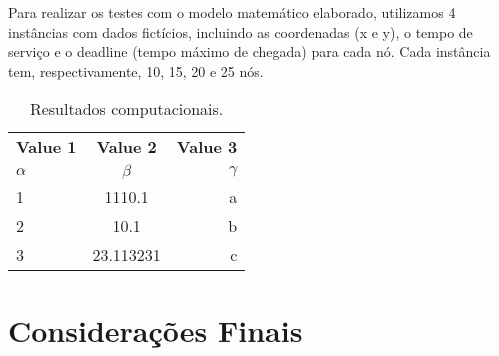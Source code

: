 \documentclass[12pt]{article}
\begin{document}
Para realizar os testes com o modelo matemático elaborado, utilizamos 4 instâncias com dados fictícios, incluindo as coordenadas (x e y), o tempo de serviço e o deadline (tempo máximo de chegada) para cada nó.
Cada instância tem, respectivamente, 10, 15, 20 e 25 nós.

\begin{table}[h!]
  \begin{center}
    \caption{Resultados computacionais.}
    \label{tab:table1}
    \begin{tabular}{l|c|r} %
      \textbf{Value 1} & \textbf{Value 2} & \textbf{Value 3} \\
      $\alpha$         & $\beta$          & $\gamma$         \\
      \hline
      1                & 1110.1           & a                \\
      2                & 10.1             & b                \\
      3                & 23.113231        & c                \\
    \end{tabular}
  \end{center}
\end{table}


\section{Considerações Finais}




\end{document}

